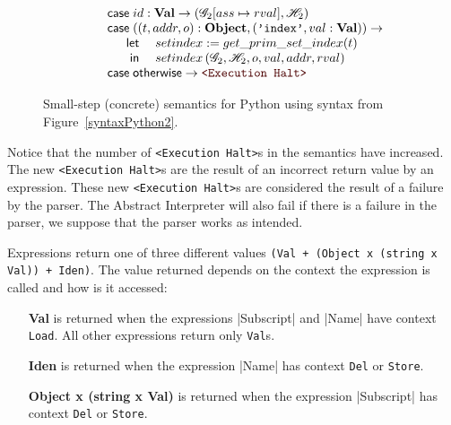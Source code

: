 \begin{figure}
\[\begin{array}[t]{l}
    \qquad \casem{id: \mathbf{Val}} \to \left(\Glo_2[ass \mapsto rval], \Hea_2\right) \\
    \qquad \casem{((t, addr, o): \mathbf{Object}, (\texttt{'index'}, val: \mathbf{Val}))} \to \\
    \qquad\quad\begin{array}[t]{rl}
            \letm& setindex := get\_prim\_set\_index(t) \\
             \inm& setindex\left(\Glo_2, \Hea_2, o, val, addr, rval\right) \\
    \end{array} \\
    \qquad \casem{\textsf{otherwise}} \to \Halt \\
  \end{array}\]
\caption{Small-step (concrete) semantics for Python using syntax from
  Figure~\ref{syntaxPython2}.\label{smallstep2}}
\end{figure}

Notice that the number of \verb+<Execution Halt>+s in the semantics have increased. The
new \verb+<Execution Halt>+s are the result of an incorrect return value by an expression.
These new \verb+<Execution Halt>+s are considered the result of a failure by the parser.
The Abstract Interpreter will also fail if there is a failure in the parser, we suppose
that the parser works as intended.

Expressions return one of three different values
\verb|(Val + (Object x (string x Val)) + Iden)|. The value returned depends on the
context the expression is called and how is it accessed:

\begin{itemize}
\tightlist
\item[\textbf{Val}] is returned when the expressions \pycode|Subscript| and \pycode|Name|
  have context \verb|Load|. All other expressions return only \verb|Val|s.
\item[\textbf{Iden}] is returned when the expression \pycode|Name| has context \verb|Del|
  or \verb|Store|.
\item[\textbf{Object x (string x Val)}] is returned when the expression \pycode|Subscript|
  has context \verb|Del| or \verb|Store|.
\end{itemize}

%

